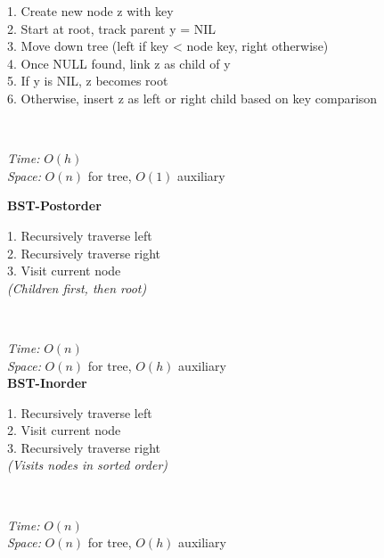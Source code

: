 \documentclass[a4paper]{extarticle}
\newcommand{\algofont}{\fontsize{4.3pt}{4.7pt}\selectfont}
\newcommand{\algocode}[1]{%
  \vspace{0pt}%
  \begin{algorithm}[H]
    \setlength{\abovecaptionskip}{0pt}%
    \setlength{\belowcaptionskip}{0pt}
    \setlength{\intextsep}{0pt}%
    \setlength{\textfloatsep}{0pt}
    \algofont  %
  \end{algorithm}%
  \vspace{0pt}%
}
\begin{document}
\begin{paracol}{3}
{\begin{minipage}[t]{1\linewidth}
\begin{minipage}[t]{0.49\linewidth}
\begin{minipage}[t]{\linewidth}
           1. Create new node z with key\\
           2. Start at root, track parent y = NIL\\
           3. Move down tree (left if key < node key, right otherwise)\\
           4. Once NULL found, link z as child of y\\
           5. If y is NIL, z becomes root\\
           6. Otherwise, insert z as left or right child based on key comparison
       \end{minipage}\\[-10px]
       \algocode{bst-insert}\vspace*{-25px}
       \textit{Time:} \(O(h)\)\\
       \textit{Space:} \(O(n)\) for tree, \(O(1)\) auxiliary
   \end{minipage}
   \hfill
   \begin{minipage}[t]{0.5\linewidth}
       \textbf{BST-Postorder}\\
       \begin{minipage}[t]{\linewidth}
           1. Recursively traverse left\\
           2. Recursively traverse right\\
           3. Visit current node\\
           \textit{(Children first, then root)}
       \end{minipage}\\[-10px]
       \algocode{bst-postorder}\vspace*{-25px}
       \textit{Time:} \(O(n)\)\\
       \textit{Space:} \(O(n)\) for tree, \(O(h)\) auxiliary\\
       \textbf{BST-Inorder}\\
       \begin{minipage}[t]{\linewidth}
           1. Recursively traverse left\\
           2. Visit current node\\
           3. Recursively traverse right\\
           \textit{(Visits nodes in sorted order)}
       \end{minipage}\\[-10px]
       \algocode{bst-inorder}\vspace*{-25px}
       \textit{Time:} \(O(n)\)\\
       \textit{Space:} \(O(n)\) for tree, \(O(h)\) auxiliary\\

\end{minipage}
\end{minipage}}
\end{paracol}
\end{document}
